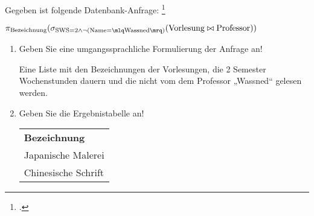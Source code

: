 \documentclass{bschlangaul-aufgabe}
\begin{document}

Gegeben ist folgende Datenbank-Anfrage:
\footcite{db:pu:2}

\begin{math}
\pi_{\text{Bezeichnung}}(
  \sigma_{\text{SWS} = 2 \land\neg(\text{Name} = \mlq \text{Wassned} \mrq)}(
    \text{Vorlesung} \bowtie \text{Professor}
  )
)
\end{math}

\begin{enumerate}


\item Geben Sie eine umgangssprachliche Formulierung der Anfrage an!

\begin{bAntwort}
Eine Liste mit den Bezeichnungen der Vorlesungen, die 2 Semester
Wochenstunden dauern und die nicht vom dem Professor „Wassned“ gelesen
werden.
\end{bAntwort}


\item Geben Sie die Ergebnistabelle an!

\begin{bAntwort}

\begin{tabular}{|l|}
\hline
\textbf{Bezeichnung}\\
Japanische Malerei\\
Chinesische Schrift\\
\hline
\end{tabular}
\end{bAntwort}
\end{enumerate}
\end{document}
